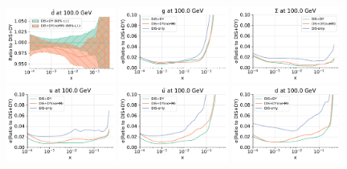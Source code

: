 \documentclass[withindex,glossary]{cam-thesis}
\begin{document}
\begin{figure}[H]
  \includegraphics[width=0.32\textwidth]{dy_figures/HDMY_Bases1_PDFRanges_DistPDFs_plot_pdfs_bard.pdf}
  \includegraphics[width=0.32\textwidth]{dy_figures/HDMY_Bases0_UncRanges_UncPDFs_plot_pdf_uncertainties_g.pdf}
  \includegraphics[width=0.32\textwidth]{dy_figures/HDMY_Bases0_UncRanges_UncPDFs_plot_pdf_uncertainties_Sigma.pdf}
  \includegraphics[width=0.32\textwidth]{dy_figures/HDMY_Bases1_UncRanges_UncPDFs_plot_pdf_uncertainties_u.pdf}
  \includegraphics[width=0.32\textwidth]{dy_figures/HDMY_Bases1_UncRanges_UncPDFs_plot_pdf_uncertainties_baru.pdf}
  \includegraphics[width=0.32\textwidth]{dy_figures/HDMY_Bases1_UncRanges_UncPDFs_plot_pdf_uncertainties_d.pdf}

\end{figure}
\end{document}
